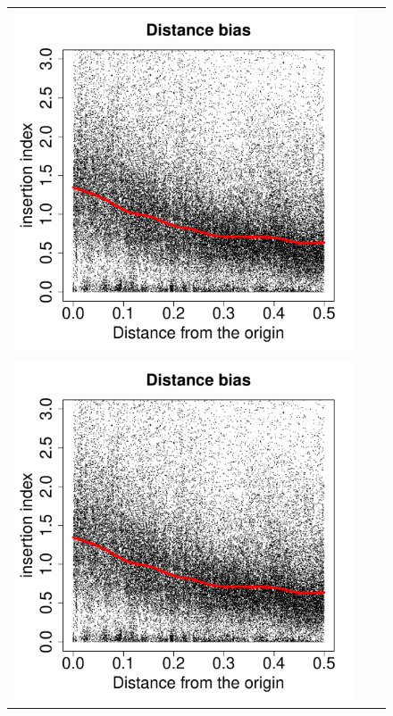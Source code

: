 \documentclass[a4paper,10pt, twocolumn]{article}
\begin{document}
\begin{figure}
\begin{tabular}{c c c}
\includegraphics[page=10, scale=0.22]{biases.pdf} \\
\includegraphics[page=11, scale=0.22]{biases.pdf} & 

\end{tabular}
\end{figure}
\end{document}
